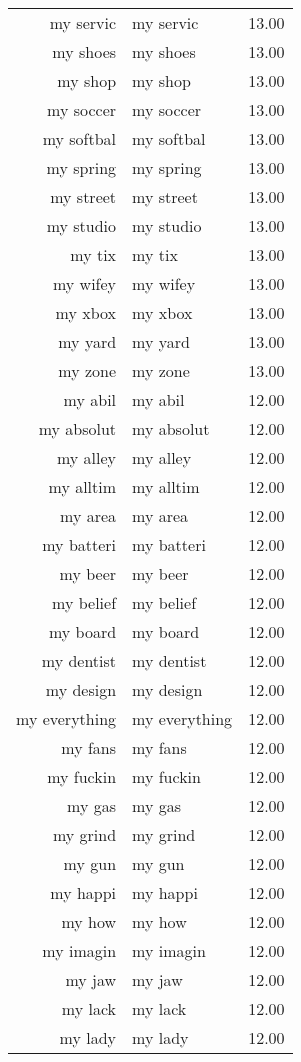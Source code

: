 \begin{table}[ht]
\begin{tabular}{rlr}
  my servic & my servic & 13.00 \\ 
  my shoes & my shoes & 13.00 \\ 
  my shop & my shop & 13.00 \\ 
  my soccer & my soccer & 13.00 \\ 
  my softbal & my softbal & 13.00 \\ 
  my spring & my spring & 13.00 \\ 
  my street & my street & 13.00 \\ 
  my studio & my studio & 13.00 \\ 
  my tix & my tix & 13.00 \\ 
  my wifey & my wifey & 13.00 \\ 
  my xbox & my xbox & 13.00 \\ 
  my yard & my yard & 13.00 \\ 
  my zone & my zone & 13.00 \\ 
  my abil & my abil & 12.00 \\ 
  my absolut & my absolut & 12.00 \\ 
  my alley & my alley & 12.00 \\ 
  my alltim & my alltim & 12.00 \\ 
  my area & my area & 12.00 \\ 
  my batteri & my batteri & 12.00 \\ 
  my beer & my beer & 12.00 \\ 
  my belief & my belief & 12.00 \\ 
  my board & my board & 12.00 \\ 
  my dentist & my dentist & 12.00 \\ 
  my design & my design & 12.00 \\ 
  my everything & my everything & 12.00 \\ 
  my fans & my fans & 12.00 \\ 
  my fuckin & my fuckin & 12.00 \\ 
  my gas & my gas & 12.00 \\ 
  my grind & my grind & 12.00 \\ 
  my gun & my gun & 12.00 \\ 
  my happi & my happi & 12.00 \\ 
  my how & my how & 12.00 \\ 
  my imagin & my imagin & 12.00 \\ 
  my jaw & my jaw & 12.00 \\ 
  my lack & my lack & 12.00 \\ 
  my lady & my lady & 12.00 \\ 

\end{tabular}
\end{table}
